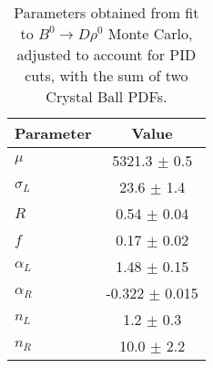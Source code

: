 \begin{table}
  \centering
  \begin{tabular}{lc}
      \toprule
      Parameter & Value \\
      \midrule
      $\mu$ & 5321.3 $\pm$ 0.5 \\
      $\sigma_L$ & 23.6 $\pm$ 1.4 \\
      $R$ & 0.54 $\pm$ 0.04 \\
      $f$ & 0.17 $\pm$ 0.02 \\
      $\alpha_L$ & 1.48 $\pm$ 0.15 \\
      $\alpha_R$ & -0.322 $\pm$ 0.015 \\
      $n_L$ & 1.2 $\pm$ 0.3 \\
      $n_R$ & 10.0 $\pm$ 2.2 \\
  \bottomrule
  \end{tabular}
  \caption{Parameters obtained from fit to $B^0 \to D\rho^0$ Monte  Carlo, adjusted to account for PID cuts, with the sum of two Crystal Ball PDFs.}
\label{tab:rho_mc_params}
\end{table}
